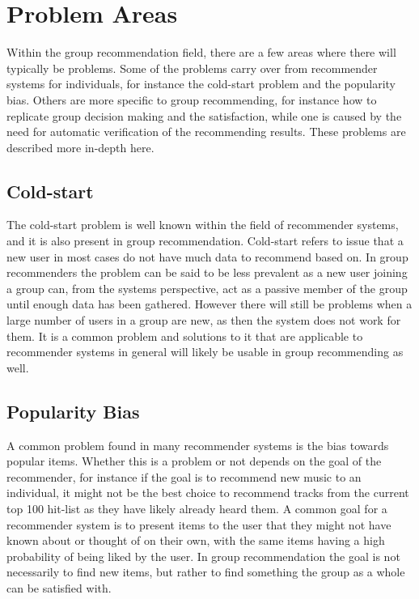 \section{Problem Areas}

Within the group recommendation field, there are a few areas where there will typically be problems. Some of the problems carry over from recommender systems for individuals, for instance the cold-start problem and the popularity bias. Others are more specific to group recommending, for instance how to replicate group decision making and the satisfaction, while one is caused by the need for automatic verification of the recommending results. These problems are described more in-depth here. 

\subsection{Cold-start}
The cold-start problem is well known within the field of recommender systems, and it is also present in group recommendation. Cold-start refers to issue that a new user in most cases do not have much data to recommend based on. In group recommenders the problem can be said to be less prevalent as a new user joining a group can, from the systems perspective, act as a passive member of the group until enough data has been gathered. However there will still be problems when a large number of users in a group are new, as then the system does not work for them. It is a common problem and solutions to it that are applicable to recommender systems in general will likely be usable in group recommending as well.

\subsection{Popularity Bias}
A common problem found in many recommender systems is the bias towards popular items. Whether this is a problem or not depends on the goal of the recommender, for instance if the goal is to recommend new music to an individual, it might not be the best choice to recommend tracks from the current top 100 hit-list as they have likely already heard them. A common goal for a recommender system is to present items to the user that they might not have known about or thought of on their own, with the same items having a high probability of being liked by the user. In group recommendation the goal is not necessarily to find new items, but rather to find something the group as a whole can be satisfied with.

